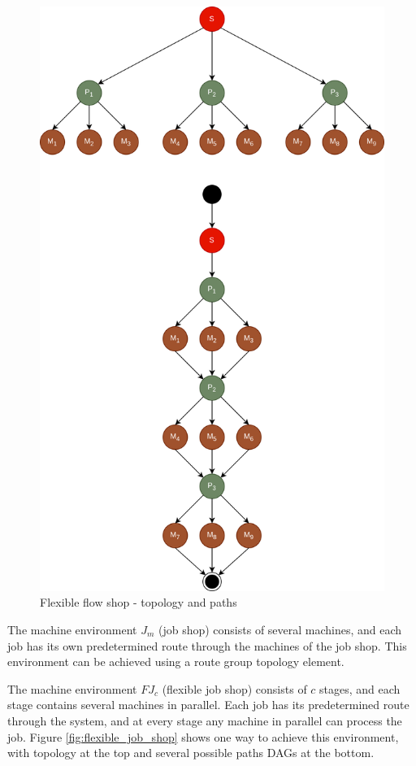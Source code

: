 \begin{figure}[!htbp]
	\centering
	\includegraphics[scale=0.3]{../images/flexible_flow_shop.png}
	\caption{Flexible flow shop - topology and paths}
    \label{fig:flexible_flow_shop}
\end{figure}

The machine environment $J_m$ (job shop) consists of several machines, and each job has its own predetermined route through the machines of the job shop. This environment can be achieved using a route group topology element.

The machine environment $FJ_c$ (flexible job shop) consists of $c$ stages, and each stage contains several machines in parallel. Each job has its predetermined route through the system, and at every stage any machine in parallel can process the job. Figure \ref{fig:flexible_job_shop} shows one way to achieve this environment, with topology at the top and several possible paths DAGs at the bottom.

